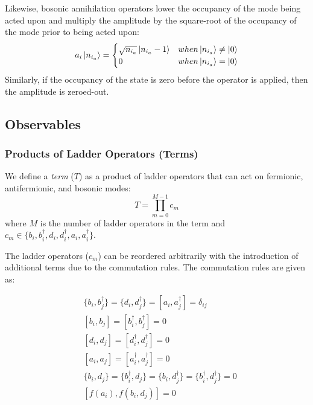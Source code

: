 Likewise, bosonic annihilation operators lower the occupancy of the mode being acted upon and multiply the amplitude by the square-root of the occupancy of the mode prior to being acted upon:
\begin{equation}
    \label{eq:bosonic-annihilation}
    a_i \ket{n_{i_a}} = 
    \begin{cases} 
        \sqrt{n_{i_a}} \ket{n_{i_a} - 1}  & when \ket{n_{i_a}} \neq \ket{0} \\
        0 & when \ket{n_{i_a}} = \ket{0}
    \end{cases}
\end{equation}
Similarly, if the occupancy of the state is zero before the operator is applied, then the amplitude is zeroed-out.

\subsection{Observables}
\label{subsec:observables}

\subsubsection{Products of Ladder Operators (Terms)}

We define a \textit{term} ($T$) as a product of ladder operators that can act on fermionic, antifermionic, and bosonic modes:
\begin{equation}
    T = \prod_{m=0}^{M-1} c_m
\end{equation}
where $M$ is the number of ladder operators in the term and $c_m \in \{b_i, b_i^\dagger, d_i, d_i^\dagger, a_i, a_i^\dagger\}$.

The ladder operators ($c_m$) can be reordered arbitrarily with the introduction of additional terms due to the commutation rules.
The commutation rules are given as:

\begin{equation}
    \label{eq:commutation}
    \begin{split}
        &\{b_i, b_j^\dagger\} = \{d_i, d_j^\dagger\} = [a_i, a_j^\dagger] = \delta_{ij}\\
        & [b_i, b_j] = [b_i^\dagger, b_j^\dagger] = 0 \\
        & [d_i, d_j] = [d_i^\dagger, d_j^\dagger] = 0 \\
        & [a_i, a_j] = [a_i^\dagger, a_j^\dagger] = 0 \\
        & \{b_i, d_j\} = \{b_i^\dagger, d_j\} = \{b_i, d_j^\dagger\} = \{b_i^\dagger, d_j^\dagger\} = 0\\
        & [f(a_i), f(b_i, d_j)] = 0
    \end{split}
\end{equation}

